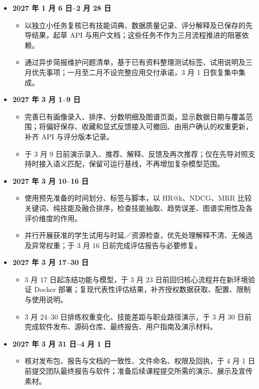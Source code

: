 \documentclass[a4paper,12pt]{article}
\begin{document}
\begin{itemize}
  \item \textbf{2027 年 1 月 6 日--2 月 28 日}
    \begin{itemize}
      \item 以独立小任务复核已有技能词典、数据质量记录、评分解释及已保存的先导结果，起草 API 与用户文档；这些任务不作为三月流程推进的阻塞依赖。
      \item 通过异步简报维护问题清单，基于已有资料整理测试标签、试用说明及三月优先事项；一月至二月不设完整应用交付承诺，3 月 1 日恢复集中集成。
    \end{itemize}

  \item \textbf{2027 年 3 月 1--9 日}
    \begin{itemize}
      \item 完善已有画像录入、排序、分数明细及图谱页面，显示数据日期与覆盖范围；将偏好保存、收藏和显式反馈接入可撤回、由用户确认的权重更新，补齐 API 与评分版本记录。
      \item 于 3 月 9 日前演示录入、推荐、解释、反馈及再次推荐；仅在先导对照支持时接入语义匹配，保留可运行基线，不再增加复杂模型范围。
    \end{itemize}

  \item \textbf{2027 年 3 月 10--16 日}
    \begin{itemize}
      \item 使用预先准备的时间划分、标签与脚本，以 HR@k、NDCG、MRR 比较关键词、纯技能及融合排序，检查技能抽取、趋势误差、图谱实用性及各评价维度的作用。
      \item 并行开展获准的学生试用与时延／资源检查，优先处理解释不清、无候选及异常权重；于 3 月 16 日前完成评估报告与必要修复。
    \end{itemize}

  \item \textbf{2027 年 3 月 17--30 日}
    \begin{itemize}
      \item 3 月 17 日起冻结功能与模型，于 3 月 23 日前回归核心流程并在新环境验证 Docker 部署；复现代表性评估结果，补齐授权数据获取、配置、限制与使用说明。
      \item 3 月 24--30 日排练权重变化、技能差距与职业路径演示，于 3 月 30 日前完成软件发布、源码仓库、最终报告、用户指南及演示材料。
    \end{itemize}

  \item \textbf{2027 年 3 月 31 日--4 月 1 日}
    \begin{itemize}
      \item 核对发布包、报告与文档的一致性、文件命名、权限及回执，于 4 月 1 日前提交团队最终报告与软件；准备后续课程提交所需的演示、展示及宣传素材。
    \end{itemize}

\end{itemize}
\end{document}
